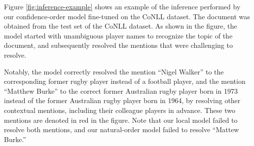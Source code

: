 \documentclass[11pt,a4paper]{article}
\begin{document}
Figure \ref{fig:inference-example} shows an example of the inference performed by our confidence-order model fine-tuned on the CoNLL dataset.
The document was obtained from the test set of the CoNLL dataset.
As shown in the figure, the model started with unambiguous player names to recognize the topic of the document, and subsequently resolved the mentions that were challenging to resolve.

Notably, the model correctly resolved the mention ``Nigel Walker'' to the corresponding former rugby player instead of a football player, and the mention ``Matthew Burke'' to the correct former Australian rugby player born in 1973 instead of the former Australian rugby player born in 1964, by resolving other contextual mentions, including their colleague players in advance.
These two mentions are denoted in red in the figure.
Note that our local model failed to resolve both mentions, and our natural-order model failed to resolve ``Mattew Burke.''
\end{document}
